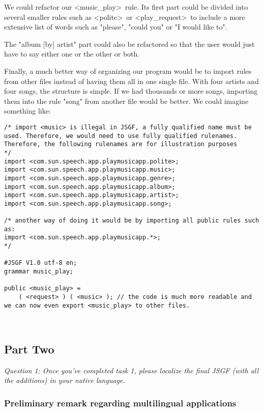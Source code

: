 \documentclass[12pt, a4paper]{article}
\begin{document}
We could refactor our \textless music\_play\textgreater\ rule. Its first part could be divided into several smaller rules such as \textless polite\textgreater\ or \textless play\_request\textgreater\  to include a more extensive list of words such as "please", "could you" or "I would like to". 

The "album [by] artist" part could also be refactored so that the user would just have to say either one or the other or both. 

Finally, a much better way of organizing our program would be to import rules from other files instead of having them all in one single file. With four artists and four songs, the structure is simple. If we had thousands or more songs, importing them into the rule "song" from another file would be better. We could imagine something like: 

\begin{lstlisting}
/* import <music> is illegal in JSGF, a fully qualified name must be used. Therefore, we would need to use fully qualified rulenames. Therefore, the following rulenames are for illustration purposes
*/
import <com.sun.speech.app.playmusicapp.polite>;
import <com.sun.speech.app.playmusicapp.music>;
import <com.sun.speech.app.playmusicapp.genre>;
import <com.sun.speech.app.playmusicapp.album>;
import <com.sun.speech.app.playmusicapp.artist>;
import <com.sun.speech.app.playmusicapp.song>;

/* another way of doing it would be by importing all public rules such as:
import <com.sun.speech.app.playmusicapp.*>;
*/

#JSGF V1.0 utf-8 en;
grammar music_play;

public <music_play> = 
    ( <request> ) ( <music> ); // the code is much more readable and we can now even export <music_play> to other files.



\end{lstlisting}

\subsection{Part Two}

\emph{Question 1: Once you’ve completed task 1, please localize the final JSGF (with all the additions) in your native
language.}

\subsubsection{Preliminary remark regarding multilingual applications}
\end{document}
